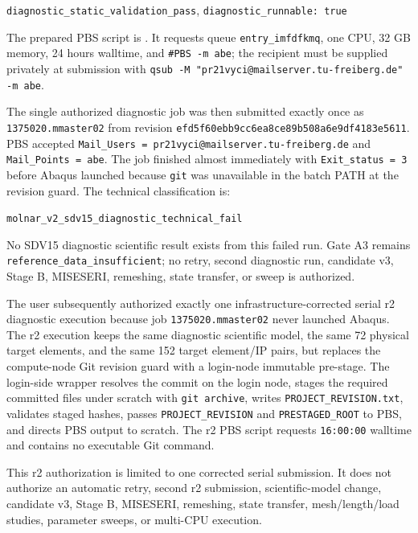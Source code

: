 \documentclass[11pt,a4paper]{article}
\begin{document}
\begin{center}
\texttt{diagnostic\_static\_validation\_pass}, \texttt{diagnostic\_runnable: true}
\end{center}

The prepared PBS script is . It requests queue \texttt{entry\_imfdfkmq}, one CPU, 32 GB memory, 24 hours walltime, and \texttt{\#PBS -m abe}; the recipient must be supplied privately at submission with \texttt{qsub -M "pr21vyci@mailserver.tu-freiberg.de" -m abe}.

The single authorized diagnostic job was then submitted exactly once as \texttt{1375020.mmaster02} from revision \texttt{efd5f60ebb9cc6ea8ce89b508a6e9df4183e5611}. PBS accepted \texttt{Mail\_Users = pr21vyci@mailserver.tu-freiberg.de} and \texttt{Mail\_Points = abe}. The job finished almost immediately with \texttt{Exit\_status = 3} before Abaqus launched because \texttt{git} was unavailable in the batch PATH at the revision guard. The technical classification is:

\begin{center}
\texttt{molnar\_v2\_sdv15\_diagnostic\_technical\_fail}
\end{center}

No SDV15 diagnostic scientific result exists from this failed run. Gate A3 remains \texttt{reference\_data\_insufficient}; no retry, second diagnostic run, candidate v3, Stage B, MISESERI, remeshing, state transfer, or sweep is authorized.

The user subsequently authorized exactly one infrastructure-corrected serial r2 diagnostic execution because job \texttt{1375020.mmaster02} never launched Abaqus. The r2 execution keeps the same diagnostic scientific model, the same 72 physical target elements, and the same 152 target element/IP pairs, but replaces the compute-node Git revision guard with a login-node immutable pre-stage. The login-side wrapper  resolves the commit on the login node, stages the required committed files under scratch with \texttt{git archive}, writes \texttt{PROJECT\_REVISION.txt}, validates staged hashes, passes \texttt{PROJECT\_REVISION} and \texttt{PRESTAGED\_ROOT} to PBS, and directs PBS output to scratch. The r2 PBS script  requests \texttt{16:00:00} walltime and contains no executable Git command.

This r2 authorization is limited to one corrected serial submission. It does not authorize an automatic retry, second r2 submission, scientific-model change, candidate v3, Stage B, MISESERI, remeshing, state transfer, mesh/length/load studies, parameter sweeps, or multi-CPU execution.
\end{document}
